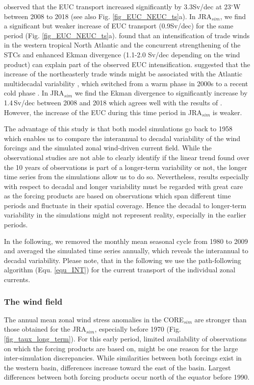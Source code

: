 \documentclass[os, manuscript]{copernicus}
\begin{document}
\cite{Brandt2021a} observed that the EUC transport increased significantly by 3.3Sv/dec at 23$^{\circ}$W between 2008 to 2018 (see also Fig. \ref{fig_EUC_NEUC_ts}a). In JRA$_{sim}$, we find a significant but weaker increase of EUC transport (0.9Sv/dec) for the same period (Fig. \ref{fig_EUC_NEUC_ts}a). \cite{Brandt2021a} found that an intensification of trade winds in the western tropical North Atlantic and the concurrent strengthening of the STCs and enhanced Ekman divergence (1.1-2.0 Sv/dec depending on the wind product) can explain part of the observed EUC intensification. \cite{Brandt2021a} suggested that the increase of the northeasterly trade winds might be associated with the Atlantic multidecadal variability \citep[AMV,][]{Delworth2000}, which switched from a warm phase in 2000s to a recent cold phase \citep{Frajka-Williams2017}. In JRA$_{sim}$ we find the Ekman divergence to significantly increase by 1.4$\,$Sv/dec between 2008 and 2018 which agrees well with the results of \cite{Brandt2021a}. However, the increase of the EUC during this time period in JRA$_{sim}$ is weaker.

The advantage of this study is that both model simulations go back to 1958 which enables us to compare the interannual to decadal variability of the wind forcings and the simulated zonal wind-driven current field. While the observational studies are not able to clearly identify if the linear trend found over the 10 years of observations is part of a longer-term variability or not, the longer time series from the simulations allow us to do so. Nevertheless, results especially with respect to decadal and longer variability must be regarded with great care as the forcing products are based on observations which span different time periods and fluctuate in their spatial coverage. Hence the decadal to longer-term variability in the simulations might not represent reality, especially in the earlier periods. 

In the following, we removed the monthly mean seasonal cycle from 1980 to 2009 and averaged the simulated time series annually, which reveals the interannual to decadal variability. Please note, that in the following we use the path-following algorithm (Equ. \ref{equ_INT}) for the current transport of the individual zonal currents.


\subsubsection{The wind field}
The annual mean zonal wind stress anomalies in the CORE$_{sim}$ are stronger than those obtained for the JRA$_{sim}$, especially before 1970 (Fig. \ref{fig_taux_long_term}). For this early period, limited availability of observations on which the forcing products are based on, might be one reason for the large inter-simulation discrepancies. While similarities between both forcings exist in the western basin, differences increase toward the east of the basin. Largest differences between both forcing products occur north of the equator before 1990.
\end{document}
